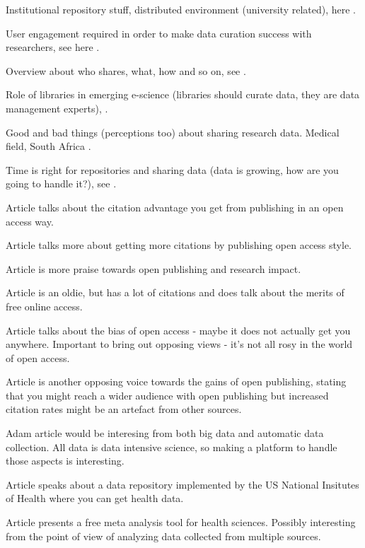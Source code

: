 Institutional repository stuff, distributed environment (university related),
here \cite{DBLP:journals/libt/Witt08}.

User engagement required in order to make data curation success with
researchers, see here \cite{DBLP:conf/ercimdl/Martinez-UribeM09}.

Overview about who shares, what, how and so on, see
\cite{borgman2010research}.

Role of libraries in emerging e-science (libraries should curate data, they are
data management experts), \cite{heidorn2011emerging}.

Good and bad things (perceptions too) about sharing research data. Medical
field, South Africa \cite{denny2015developing}.

Time is right for repositories and sharing data (data is growing, how are you
going to handle it?), see \cite{lynch2008big}.

Article \cite{eysenbach2006citation} talks about the citation advantage you get
from publishing in an open access way.

Article \cite{DBLP:journals/oir/XiaN12} talks more about getting more citations
by publishing open access style.

Article \cite{antelman2004open} is more praise towards open publishing and
research impact.

Article \cite{lawrence2001free} is an oldie, but has a lot of citations and
does talk about the merits of free online access.

Article \cite{DBLP:journals/joi/CraigPMPA07} talks about the bias of open
access - maybe it does not actually get you anywhere. Important to bring out
opposing views - it's not all rosy in the world of open access.

Article \cite{davis2008open} is another opposing voice towards the gains of
open publishing, stating that you might reach a wider audience with open
publishing but increased citation rates might be an artefact from other
sources.

Adam article \cite{DBLP:conf/sigmod/NothaftMDZLYKAH15} would be interesing from
both big data and automatic data collection. All data is data intensive
science, so making a platform to handle those aspects is interesting.

Article \cite{cimino2010clinical} speaks about a data repository implemented
by the US National Insitutes of Health where you can get health data.

Article \cite{bax2006development} presents a free meta analysis tool for health
sciences. Possibly interesting from the point of view of analyzing data
collected from multiple sources.

